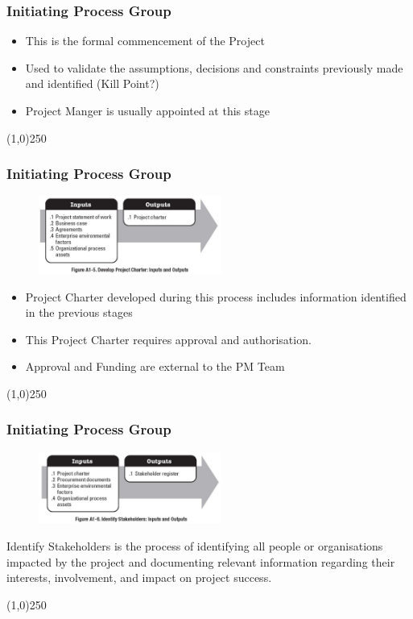 \begin{frame}
\frametitle{Initiating Process Group}
\begin{itemize}
	\item This is the formal commencement of the Project
	\item Used to validate the assumptions, decisions and constraints previously made and identified (Kill Point?)
	\item Project Manger is usually appointed at this stage
\end{itemize}
\end{frame}
\begin{center}\line(1,0){250}\end{center}



\begin{frame}
\frametitle{Initiating Process Group}
\begin{figure}
	\centering
		\includegraphics[width = 6cm]{images/FigA1-5.jpg}
	\label{fig:A1-5}
\end{figure} 
\begin{itemize}
	\item Project Charter developed during this process includes information identified in the previous stages
	\item This Project Charter requires approval and authorisation.
	\item Approval and Funding are external to the PM Team
\end{itemize}
\end{frame}
\begin{center}\line(1,0){250}\end{center}



\begin{frame}
\frametitle{Initiating Process Group}
\begin{figure}
	\centering
		\includegraphics[width = 6cm]{images/FigA1-6.jpg}
	\label{fig:A1-6}
\end{figure} 
Identify Stakeholders is the process of identifying all people or organisations impacted by the project and documenting relevant information regarding their interests, involvement, and impact on project success.
\end{frame}
\begin{center}\line(1,0){250}\end{center}



